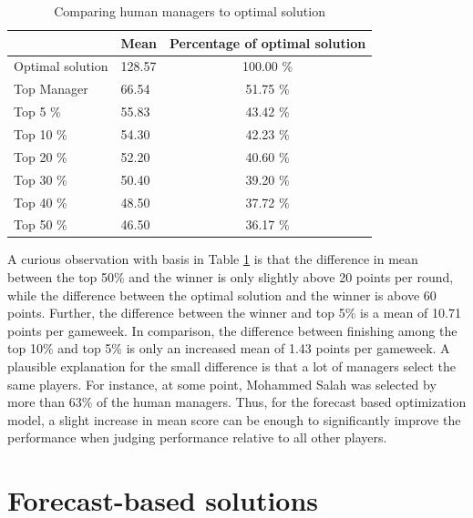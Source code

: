 \begin{table}[H]
\centering
\begin{tabular}{llc}
\hline
                 & Mean   & \multicolumn{1}{l}{Percentage of optimal solution} \\
\hline                 
Optimal solution & 128.57 & 100.00 \%                                          \\
Top Manager           & 66.54  & 51.75 \%                                           \\
Top 5 \%         & 55.83  & 43.42 \%                                           \\
Top 10 \%        & 54.30  & 42.23 \%                                           \\
Top 20 \%        & 52.20  & 40.60 \%                                           \\
Top 30 \%        & 50.40  & 39.20 \%                                           \\
Top 40 \%        & 48.50  & 37.72 \%                                           \\
Top 50 \%        & 46.50  & 36.17 \%                                           \\
\hline
\end{tabular}
\caption{Comparing human managers to optimal solution}
\label{Optimal_Human}
\end{table}

A curious observation with basis in Table \ref{Optimal_Human} is that the difference in mean between the top 50\% and the winner is only slightly above 20 points per round, while the difference between the optimal solution and the winner is above 60 points. Further, the difference between the winner and top 5\% is a mean of 10.71 points per gameweek. In comparison, the difference between finishing among the top 10\% and top 5\% is only an increased mean of 1.43 points per gameweek.  A plausible explanation for the small difference is that a lot of managers select the same players. For instance, at some point, Mohammed Salah was selected by more than 63\% of the human managers.  Thus, for the forecast based optimization model, a slight increase in mean score can be enough to significantly improve the performance when judging performance relative to all other players. 


\section{Forecast-based solutions}\label{sec:inexact}

